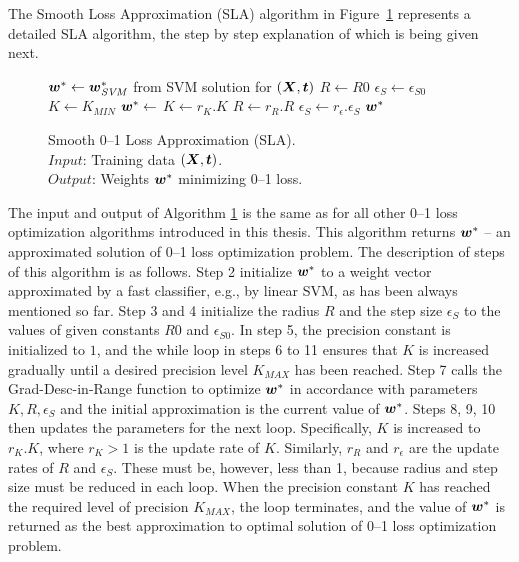 The Smooth Loss Approximation (SLA) algorithm in
Figure~\ref{alg:sla.algorithm} represents a detailed SLA algorithm,
the step by step explanation of which is being given next.

\begin{figure}
\vspace{-3mm}
\caption{
Smooth 0--1 Loss Approximation (SLA). \\
\text{\hspace{1.4cm}} $Input$: Training data $(\boldsymbol{X},\boldsymbol{t})$. \\
\text{\hspace{1.4cm}} $Output$: Weights $\boldsymbol{w}^*$ minimizing 0--1 loss.
}
\label{alg:sla.algorithm}
{\footnotesize
\begin{algorithmic}[1]
 
   \State $\boldsymbol{w}^* \gets \boldsymbol{w}^*_{\mathit{SVM}}$ from SVM solution for $(\boldsymbol{X},\boldsymbol{t})$
   \State $R \gets R0$
   \State $\epsilon_S \gets \epsilon_{S0}$
   \State $K \gets K_{MIN}$
      \State $\boldsymbol{w}^* \gets$ 
      \State $K \gets r_K.K$
      \State $R \gets r_R.R$
      \State $\epsilon_S \gets r_\epsilon.\epsilon_S$
   \EndWhile
   \State \Return $\boldsymbol{w}^*$
\EndFunction
\end{algorithmic}}
\vspace{-4mm}
\end{figure}

The input and output of Algorithm \ref{alg:sla.algorithm} is the same
as for all other 0--1 loss optimization algorithms introduced in this
thesis. This algorithm returns $\boldsymbol{w}^*$ -- an approximated solution of
0--1 loss optimization problem. The description of steps of this
algorithm is as follows. Step 2 initialize $\boldsymbol{w}^*$ to a weight vector
approximated by a fast classifier, e.g., by linear SVM, as has been
always mentioned so far. Step 3 and 4 initialize the radius $R$ and
the step size $\epsilon_S$ to the values of given constants $R0$ and
$\epsilon_{S0}$. In step 5, the precision constant is initialized to
$1$, and the while loop in steps 6 to 11 ensures that $K$ is increased
gradually until a desired precision level $K_{MAX}$ has been
reached. Step 7 calls the {\sc Grad-Desc-in-Range} function to
optimize $\boldsymbol{w}^*$ in accordance with parameters $K, R, \epsilon_S$ and
the initial approximation is the current value of $\boldsymbol{w}^*$. Steps 8, 9,
10 then updates the parameters for the next loop. Specifically, $K$ is
increased to $r_K.K$, where $r_K>1$ is the update rate of
$K$. Similarly, $r_R$ and $r_\epsilon$ are the update rates of $R$ and
$\epsilon_S$. These must be, however, less than 1, because radius and
step size must be reduced in each loop. When the precision constant
$K$ has reached the required level of precision $K_{MAX}$, the loop
terminates, and the value of $\boldsymbol{w}^*$ is returned as the best
approximation to optimal solution of 0--1 loss optimization problem.

